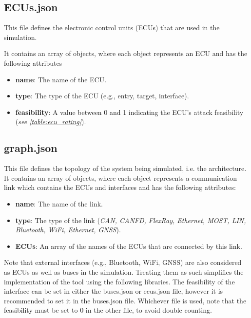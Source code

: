 \subsection{ECUs.json}
\label{sec:ECUs}

This file defines the electronic control units (ECUs) that are used in the simulation. 

It contains an array of objects, where each object represents an ECU and has the following attributes

\begin{itemize}
\item \textbf{name}: The name of the ECU.
\item \textbf{type}: The type of the ECU (e.g., entry, target, interface).
\item \textbf{feasibility}: A value between 0 and 1 indicating the ECU's attack feasibility (\textit{see \ref{table:ecu_rating}}).
\end{itemize}

\subsection{graph.json}
\label{sec:graph}

This file defines the topology of the system being simulated, i.e. the architecture. 
It contains an array of objects, where each object represents a communication link which contains the ECUs and interfaces and has the following attributes:

\begin{itemize}
\item \textbf{name}: The name of the link.
\item \textbf{type}: The type of the link (\textit{CAN, CANFD, FlexRay, Ethernet, MOST, LIN, Bluetooth, WiFi, Ethernet, GNSS}).
\item \textbf{ECUs}: An array of the names of the ECUs that are connected by this link.
\end{itemize}

Note that external interfaces (e.g., Bluetooth, WiFi, GNSS) are also considered as ECUs as well as buses in the simulation.
Treating them as such simplifies the implementation of the tool using the following libraries.
The feasibility of the interface can be set in either the buses.json or ecus.json file, however it is recommended to set it in the buses.json file.
Whichever file is used, note that the feasibility must be set to 0 in the other file, to avoid double counting.


